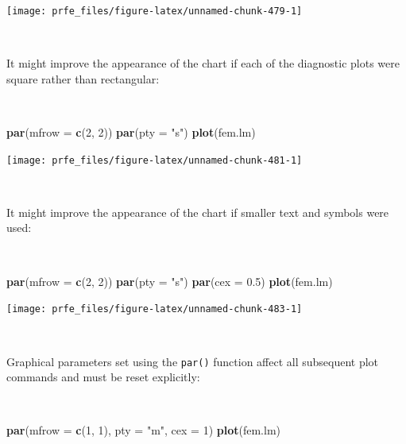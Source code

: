 \documentclass[12pt,a4paper]{book}
\newenvironment{Shaded}{\begin{snugshade}}{\end{snugshade}}
\newcommand{\KeywordTok}[1]{\textcolor[rgb]{0.13,0.29,0.53}{\textbf{#1}}}
\newcommand{\DataTypeTok}[1]{\textcolor[rgb]{0.13,0.29,0.53}{#1}}
\newcommand{\DecValTok}[1]{\textcolor[rgb]{0.00,0.00,0.81}{#1}}
\newcommand{\FloatTok}[1]{\textcolor[rgb]{0.00,0.00,0.81}{#1}}
\newcommand{\StringTok}[1]{\textcolor[rgb]{0.31,0.60,0.02}{#1}}
\newcommand{\NormalTok}[1]{#1}
\theoremstyle{definition}
\theoremstyle{definition}
\theoremstyle{definition}
\theoremstyle{remark}
\begin{document}
\begin{center}\texttt{[image: prfe\_files/figure-latex/unnamed-chunk-479-1]} \end{center}

~

It might improve the appearance of the chart if each of the diagnostic
plots were square rather than rectangular:

~

\begin{Shaded}
\begin{Highlighting}[]
\KeywordTok{par}\NormalTok{(}\DataTypeTok{mfrow =} \KeywordTok{c}\NormalTok{(}\DecValTok{2}\NormalTok{, }\DecValTok{2}\NormalTok{))}
\KeywordTok{par}\NormalTok{(}\DataTypeTok{pty =} \StringTok{"s"}\NormalTok{)}
\KeywordTok{plot}\NormalTok{(fem.lm)}
\end{Highlighting}
\end{Shaded}

\newpage

\begin{center}\texttt{[image: prfe\_files/figure-latex/unnamed-chunk-481-1]} \end{center}

~

It might improve the appearance of the chart if smaller text and symbols
were used:

~

\begin{Shaded}
\begin{Highlighting}[]
\KeywordTok{par}\NormalTok{(}\DataTypeTok{mfrow =} \KeywordTok{c}\NormalTok{(}\DecValTok{2}\NormalTok{, }\DecValTok{2}\NormalTok{))}
\KeywordTok{par}\NormalTok{(}\DataTypeTok{pty =} \StringTok{"s"}\NormalTok{)}
\KeywordTok{par}\NormalTok{(}\DataTypeTok{cex =} \FloatTok{0.5}\NormalTok{)}
\KeywordTok{plot}\NormalTok{(fem.lm)}
\end{Highlighting}
\end{Shaded}

\newpage

\begin{center}\texttt{[image: prfe\_files/figure-latex/unnamed-chunk-483-1]} \end{center}

~

Graphical parameters set using the \texttt{par()} function affect all
subsequent plot commands and must be reset explicitly:

~

\begin{Shaded}
\begin{Highlighting}[]
\KeywordTok{par}\NormalTok{(}\DataTypeTok{mfrow =} \KeywordTok{c}\NormalTok{(}\DecValTok{1}\NormalTok{, }\DecValTok{1}\NormalTok{), }\DataTypeTok{pty =} \StringTok{"m"}\NormalTok{, }\DataTypeTok{cex =} \DecValTok{1}\NormalTok{)}
\KeywordTok{plot}\NormalTok{(fem.lm)}
\end{Highlighting}
\end{Shaded}
\end{document}
